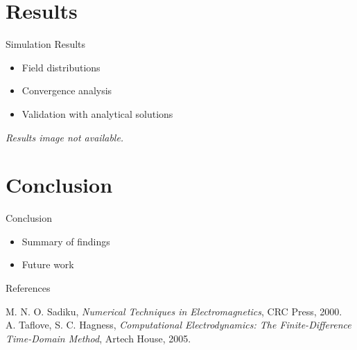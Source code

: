 \documentclass[aspectratio=54,xcolor=dvipsnames]{beamer}
\begin{document}
\section{Results}
\begin{frame}{Simulation Results}
    \begin{itemize}
        \item Field distributions
        \item Convergence analysis
        \item Validation with analytical solutions
    \end{itemize}
    \begin{center}
        \textit{Results image not available.}
    \end{center}
\end{frame}

\section{Conclusion}
\begin{frame}{Conclusion}
    \begin{itemize}
        \item Summary of findings
        \item Future work
    \end{itemize}
\end{frame}

\begin{frame}{References}
    \footnotesize
    \begin{thebibliography}{99}
         M. N. O. Sadiku, \emph{Numerical Techniques in Electromagnetics}, CRC Press, 2000.
         A. Taflove, S. C. Hagness, \emph{Computational Electrodynamics: The Finite-Difference Time-Domain Method}, Artech House, 2005.
    \end{thebibliography}
\end{frame}
\end{document}

